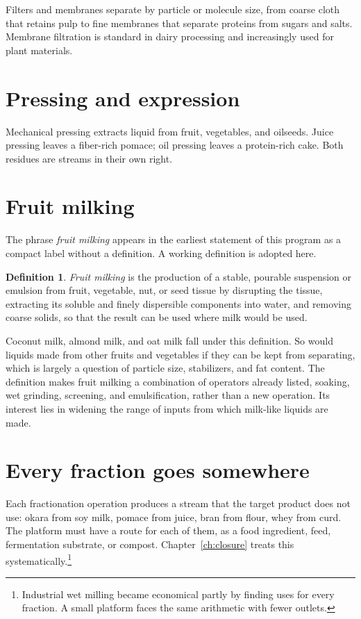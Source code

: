 \documentclass[11pt,openany]{book}
\theoremstyle{definition}
\newtheorem{definition}{Definition}[chapter]
\begin{document}
Filters and membranes separate by particle or molecule size, from coarse cloth that retains pulp to fine membranes that separate proteins from sugars and salts. Membrane filtration is standard in dairy processing and increasingly used for plant materials.

\section{Pressing and expression}

Mechanical pressing extracts liquid from fruit, vegetables, and oilseeds. Juice pressing leaves a fiber-rich pomace; oil pressing leaves a protein-rich cake. Both residues are streams in their own right.

\section{Fruit milking}

The phrase \emph{fruit milking} appears in the earliest statement of this program as a compact label without a definition. A working definition is adopted here.

\begin{definition}
\emph{Fruit milking} is the production of a stable, pourable suspension or emulsion from fruit, vegetable, nut, or seed tissue by disrupting the tissue, extracting its soluble and finely dispersible components into water, and removing coarse solids, so that the result can be used where milk would be used.
\end{definition}

Coconut milk, almond milk, and oat milk fall under this definition. So would liquids made from other fruits and vegetables if they can be kept from separating, which is largely a question of particle size, stabilizers, and fat content. The definition makes fruit milking a combination of operators already listed, soaking, wet grinding, screening, and emulsification, rather than a new operation. Its interest lies in widening the range of inputs from which milk-like liquids are made.

\section{Every fraction goes somewhere}

Each fractionation operation produces a stream that the target product does not use: okara from soy milk, pomace from juice, bran from flour, whey from curd. The platform must have a route for each of them, as a food ingredient, feed, fermentation substrate, or compost. Chapter~\ref{ch:closure} treats this systematically.\footnote{Industrial wet milling became economical partly by finding uses for every fraction. A small platform faces the same arithmetic with fewer outlets.}
\end{document}
